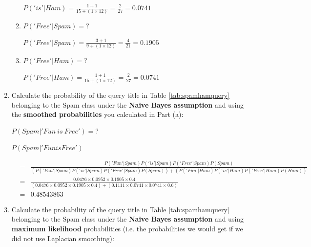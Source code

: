\documentclass[solution]{ditpaper}
\begin{document}
\begin{enumerate}
\begin{enumerate}
\begin{answer}
						$P('is'|Ham) = \frac{1+1}{15 + (1 \times 12)} = \frac{2}{27} = 0.0741$
					\end{answer}
				\item $P('Free'|Spam)=?$
					\begin{answer}
						$P('Free'|Spam) = \frac{3+1}{9 + (1 \times 12)} = \frac{4}{21} = 0.1905$
					\end{answer}
				\item $P('Free'|Ham)=?$
					\begin{answer}
						$P('Free'|Ham) = \frac{1+1}{15 + (1 \times 12)} = \frac{2}{27} = 0.0741$
					\end{answer}
			\end{enumerate}
		\item Calculate the probability of the query title in Table \ref{tab:spamhamquery} belonging to the Spam class under the \textbf{Naive Bayes assumption} and using the \textbf{smoothed probabilities} you calculated in Part (a):		
			\begin{center}
				$P(Spam|'Fun~is~Free')=?$
			\end{center}
			\begin{answer}
				$P(Spam|'Fun is Free')$ 
				\begin{scriptsize}
				\begin{eqnarray*}
					&=& \frac{P('Fun'|Spam)P('is'|Spam)P('Free'|Spam)P(Spam)}{(P('Fun'|Spam)P('is'|Spam)P('Free'|Spam)P(Spam))+(P('Fun'|Ham)P('is'|Ham)P('Free'|Ham)P(Ham))}\\
					&=& \frac{0.0476 \times 0.0952 \times 0.1905 \times 0.4}{(0.0476 \times 0.0952 \times 0.1905 \times 0.4) + (0.1111 \times 0.0741 \times  0.0741 \times 0.6)}\\
					&=& 0.48543863
				\end{eqnarray*}
				\end{scriptsize}
			\end{answer}
		\item Calculate the probability of the query title in Table \ref{tab:spamhamquery} belonging to the Spam class under the \textbf{Naive Bayes assumption} and using \textbf{maximum likelihood} probabilities (i.e. the probabilities we would get if we did not use Laplacian smoothing):	

\end{enumerate}
\end{document}
